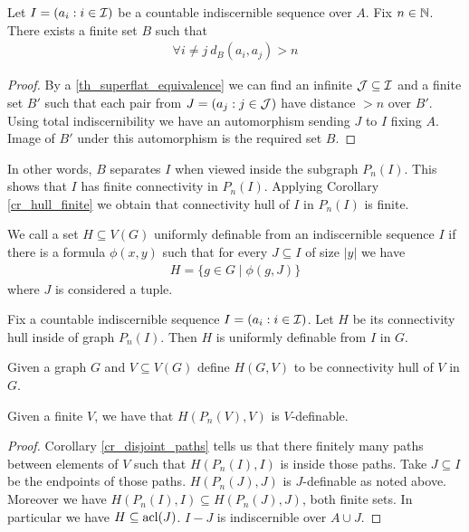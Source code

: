 \begin{Lemma} \label{lm_bump}
  Let $I = (a_i : i \in \operatorname{\mathcal I})$ be a countable indiscernible sequence over $A$. Fix $n \in \mathbb{N}$.
  There exists a finite set $B$ such that
  \begin{align*}
    \forall i \neq j \ d_B(a_i, a_j) > n
  \end{align*}
\end{Lemma}

\begin{proof}
  By a \ref{th_superflat_equivalence} we can find an infinite $\operatorname{\mathcal J} \subseteq \operatorname{\mathcal I}$ and a finite set $B'$ such that each pair from $J = (a_j : j \in \operatorname{\mathcal J})$ have distance $>n$ over $B'$.
  Using total indiscernibility we have an automorphism sending $J$ to $I$ fixing $A$.
  Image of $B'$ under this automorphism is the required set $B$.
\end{proof}

In other words, $B$ separates $I$ when viewed inside the subgraph $P_n(I)$.
This shows that $I$ has finite connectivity in $P_n(I)$.
Applying Corollary \ref{cr_hull_finite} we obtain that connectivity hull of $I$ in $P_n(I)$ is finite.

\begin{Definition}
  We call a set $H \subseteq V(G)$ uniformly definable from an indiscernible sequence $I$ if there is a formula $\phi(x, y)$ such that for every $J \subseteq I$ of size $|y|$ we have
  \begin{align*}
    H = \{g \in G \mid \phi(g, J)\}
  \end{align*}
  where $J$ is considered a tuple.
\end{Definition}

\begin{Lemma} \label{lm_uniform}
  Fix a countable indiscernible sequence $I = (a_i : i \in \operatorname{\mathcal I})$.
  Let $H$ be its connectivity hull inside of graph $P_n(I)$.
  Then $H$ is uniformly definable from $I$ in $G$.
\end{Lemma}

\begin{Definition}
  Given a graph $G$ and $V \subseteq V(G)$ define $H(G, V)$ to be connectivity hull of $V$ in $G$.
\end{Definition}

\begin{Note}
  Given a finite $V$, we have that $H(P_n(V), V)$ is $V$-definable.
\end{Note}

\begin{proof}
  Corollary \ref{cr_disjoint_paths} tells us that there finitely many paths between elements of $V$ such that $H(P_n(I), I)$ is inside those paths.
  Take $J \subseteq I$ be the endpoints of those paths.
  $H(P_n(J), J)$ is $J$-definable as noted above.
  Moreover we have $H(P_n(I), I) \subseteq H(P_n(J), J)$, both finite sets.
  In particular we have $H \subseteq \operatorname{acl}(J)$.
  $I-J$ is indiscernible over $A \cup J$.
  
\end{proof}

